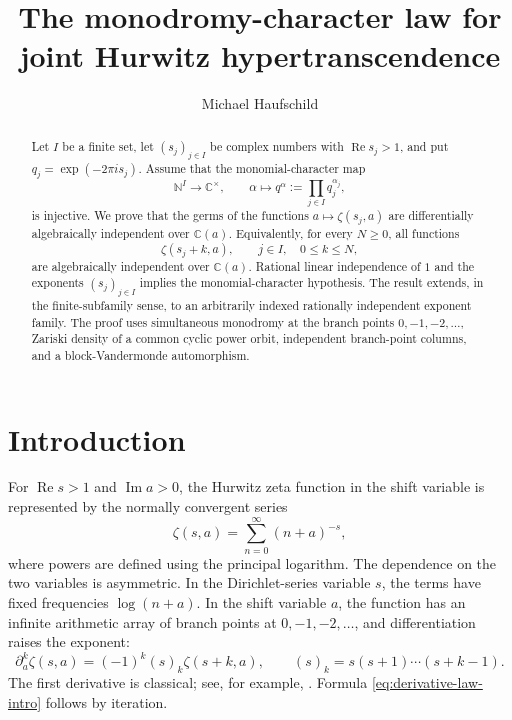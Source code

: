 \documentclass[11pt,reqno]{amsart}
\title[Joint Hurwitz hypertranscendence]
  {The monodromy-character law for joint Hurwitz hypertranscendence}
\author{Michael Haufschild}
\date{}
\theoremstyle{definition}
\theoremstyle{remark}
\newcommand{\C}{\mathbb C}
\newcommand{\N}{\mathbb N}
\begin{document}
\begin{abstract}
Let $I$ be a finite set, let $(s_j)_{j\in I}$ be complex numbers with
$\operatorname{Re}s_j>1$, and put $q_j=\exp(-2\pi i s_j)$.  Assume that the
monomial-character map
\[
  \N^I\longrightarrow\C^\times,
  \qquad \alpha\longmapsto q^\alpha:=\prod_{j\in I}q_j^{\alpha_j},
\]
is injective.  We prove that the germs of the functions
$a\mapsto\zeta(s_j,a)$ are differentially algebraically independent over
$\C(a)$.  Equivalently, for every $N\geq 0$, all functions
\[
  \zeta(s_j+k,a),\qquad j\in I,\quad 0\leq k\leq N,
\]
are algebraically independent over $\C(a)$.  Rational linear independence of
$1$ and the exponents $(s_j)_{j\in I}$ implies the monomial-character
hypothesis.  The result extends, in the finite-subfamily sense, to an
arbitrarily indexed rationally independent exponent family.  The proof uses
simultaneous monodromy at the branch points $0,-1,-2,\ldots$, Zariski density
of a common cyclic power orbit, independent branch-point columns, and a
block-Vandermonde automorphism.
\end{abstract}

\maketitle

\section{Introduction}

For $\operatorname{Re}s>1$ and $\operatorname{Im}a>0$, the Hurwitz zeta
function in the shift variable is represented by the normally convergent
series
\begin{equation}\label{eq:hurwitz-series}
  \zeta(s,a)=\sum_{n=0}^{\infty}(n+a)^{-s},
\end{equation}
where powers are defined using the principal logarithm.  The dependence on
the two variables is asymmetric.  In the Dirichlet-series variable $s$, the
terms have fixed frequencies $\log(n+a)$.  In the shift variable $a$, the
function has an infinite arithmetic array of branch points at
$0,-1,-2,\ldots$, and differentiation raises the exponent:
\begin{equation}\label{eq:derivative-law-intro}
  \partial_a^k\zeta(s,a)=(-1)^k(s)_k\zeta(s+k,a),
  \qquad
  (s)_k=s(s+1)\cdots(s+k-1).
\end{equation}
The first derivative is classical; see, for example,
\cite[Eq.~25.11.17]{DLMF}.  Formula \eqref{eq:derivative-law-intro} follows by
iteration.
\end{document}

